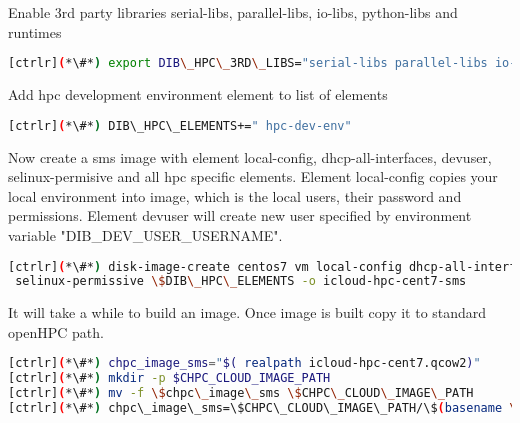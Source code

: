 Enable 3rd party libraries serial-libs, parallel-libs, io-libs, python-libs and runtimes


\begin{lstlisting}[language=bash,keywords={}]
[ctrlr](*\#*) export DIB\_HPC\_3RD\_LIBS="serial-libs parallel-libs io-libs python-libs runtimes"
\end{lstlisting} 

Add hpc development environment element to list of elements


\begin{lstlisting}[language=bash,keywords={}]
[ctrlr](*\#*) DIB\_HPC\_ELEMENTS+=" hpc-dev-env"
\end{lstlisting} 

Now create a sms image with element local-config, dhcp-all-interfaces, devuser, selinux-permisive and all hpc specific elements. Element local-config copies your local environment into image, which is the local users, their password and permissions. Element devuser will create new user specified by environment variable "DIB\_DEV\_USER\_USERNAME". 


\begin{lstlisting}[language=bash,keywords={}]
[ctrlr](*\#*) disk-image-create centos7 vm local-config dhcp-all-interfaces devuser \
 selinux-permissive \$DIB\_HPC\_ELEMENTS -o icloud-hpc-cent7-sms
\end{lstlisting} 

It will take a while to build an image. Once image is built copy it to standard openHPC path.


\begin{lstlisting}[language=bash,keywords={}]
[ctrlr](*\#*) chpc_image_sms="$( realpath icloud-hpc-cent7.qcow2)"
[ctrlr](*\#*) mkdir -p $CHPC_CLOUD_IMAGE_PATH
[ctrlr](*\#*) mv -f \$chpc\_image\_sms \$CHPC\_CLOUD\_IMAGE\_PATH
[ctrlr](*\#*) chpc\_image\_sms=\$CHPC\_CLOUD\_IMAGE\_PATH/\$(basename \$chpc\_image\_sms)
\end{lstlisting} 
